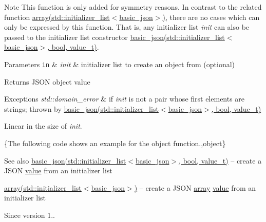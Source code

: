 \begin{DoxyNote}{Note}
This function is only added for symmetry reasons. In contrast to the related function \hyperlink{a00025_a5685815624b086caa532f41e853d4b0f}{array(std\+::initializer\+\_\+list$<$basic\+\_\+json$>$)}, there are no cases which can only be expressed by this function. That is, any initializer list {\itshape init} can also be passed to the initializer list constructor \hyperlink{a00025_afeb998aec45296bc2050bd1c41ef41eb}{basic\+\_\+json(std\+::initializer\+\_\+list$<$basic\+\_\+json$>$, bool, value\+\_\+t)}.
\end{DoxyNote}

\begin{DoxyParams}[1]{Parameters}
\mbox{\tt in}  & {\em init} & initializer list to create an object from (optional)\\
\hline
\end{DoxyParams}
\begin{DoxyReturn}{Returns}
J\+S\+ON object value
\end{DoxyReturn}

\begin{DoxyExceptions}{Exceptions}
{\em std\+::domain\+\_\+error} & if {\itshape init} is not a pair whose first elements are strings; thrown by \hyperlink{a00025_afeb998aec45296bc2050bd1c41ef41eb}{basic\+\_\+json(std\+::initializer\+\_\+list$<$basic\+\_\+json$>$, bool, value\+\_\+t)}\\
\hline
\end{DoxyExceptions}
Linear in the size of {\itshape init}.

\{The following code shows an example for the {\ttfamily object} function.,object\}

\begin{DoxySeeAlso}{See also}
\hyperlink{a00025_afeb998aec45296bc2050bd1c41ef41eb}{basic\+\_\+json(std\+::initializer\+\_\+list$<$basic\+\_\+json$>$, bool, value\+\_\+t)} -- create a J\+S\+ON \hyperlink{a00025_a0a2cbbd95862a623e7dc5c37e67dead0}{value} from an initializer list 

\hyperlink{a00025_a5685815624b086caa532f41e853d4b0f}{array(std\+::initializer\+\_\+list$<$basic\+\_\+json$>$)} -- create a J\+S\+ON \hyperlink{a00025_a5685815624b086caa532f41e853d4b0f}{array} \hyperlink{a00025_a0a2cbbd95862a623e7dc5c37e67dead0}{value} from an initializer list
\end{DoxySeeAlso}
\begin{DoxySince}{Since}
version 1.. 
\end{DoxySince}
